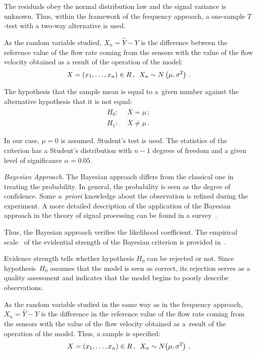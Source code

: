\begin{multicols}{2}
      The residuals obey the normal distribution law and the signal variance is 
unknown. Thus, within the framework of the frequency approach, a one-sample  
$T$-test with a two-way alternative is used.
      
      As the random variable studied, $X_n=\hat{Y}-Y$ is the difference between 
the reference value of the flow rate coming from the sensors with the value of the 
flow velocity obtained as a result of the operation of the model:
      $$
      X=\left( x_1,\ldots , x_n\right) \in R\,,\enskip X_n\sim N\left( \mu, 
\sigma^2\right)\,.
      $$
      
      The hypothesis that the sample mean is equal to a~given number against the 
alternative hypothesis that it is not equal:
      \begin{align*}
      H_0: &\ \ \overline{X}=\mu\,;\\
      H_1: &\ \ \overline{X}\not= \mu\,.
      \end{align*}
      
      In our case, $\mu=0$  is assumed. Student's test is used. The statistics of the 
criterion has a Student's distribution with $n-1$ degrees of freedom and a given level 
of significance $\alpha=0.05$.
      
      \textit{Bayesian Approach.} The Bayesian approach differs from the classical 
one in treating the probability. In general, the probability is seen as the degree of 
confidence. Some \textit{a~priori} knowledge about the observation is refined during 
the experiment. A more detailed description of the application of the Bayesian 
approach in the theory of signal processing can be found in a survey~\cite{18-tar}.
      
      Thus, the Bayesian approach verifies the likelihood coefficient. The empirical 
scale~\cite{2-tar} of the evidential strength of the Bayesian criterion is provided 
in~\cite{4-tar}.
      
      Evidence strength tells whether hypothesis $H_0$ can be rejected or not. 
Since hypothesis~$H_0$ assumes that the model is seen as correct, its rejection 
serves as a quality assessment and indicates that the model begins to poorly describe 
observations.
      
      As the random variable studied in the same way as in the frequency 
approach, $X_n=\hat{Y}-Y$ is the difference in the reference value of the flow rate 
coming from the sensors with the value of the flow velocity obtained as a~result of the 
operation of the model. Thus, a sample is specified:
      $$
      X=\left( x_1,\ldots , x_n\right) \in R\,,\enskip X_n\sim N \!\left(\mu, 
\sigma^2\right)\,.
      $$
      

\end{multicols}
